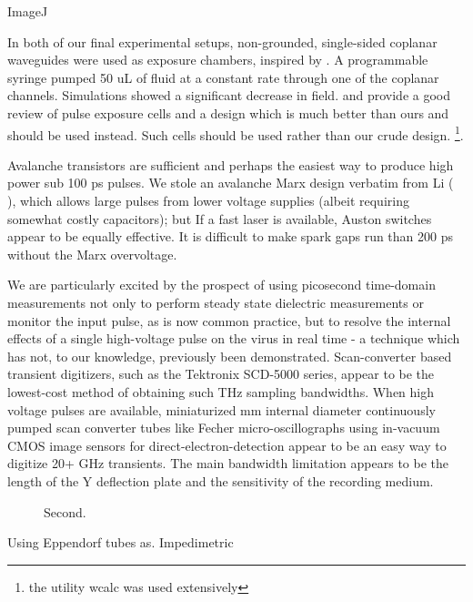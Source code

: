 \documentclass[paper.tex]{subfiles}
\begin{document}
ImageJ

In both of our final experimental setups, non-grounded, single-sided coplanar waveguides were used as exposure chambers, inspired by \cite{Microwave2007}. A programmable syringe pumped 50 uL of fluid at a constant rate through one of the coplanar channels. Simulations showed a significant decrease in field. \cite{Microchamber2011} and \cite{Characterization2012} provide a good review of pulse exposure cells and a design which is much better than ours and should be used instead. Such cells should be used rather than our crude design. \footnote{the utility wcalc was used extensively}.


Avalanche transistors are sufficient and perhaps the easiest way to produce high power sub 100 ps pulses. We stole an avalanche Marx design verbatim from Li (\cite{Development2016b} \cite{Design2018c}), which allows large pulses from lower voltage supplies (albeit requiring somewhat costly capacitors); but  If a fast laser is available, Auston switches appear to be equally effective. It is difficult to make spark gaps run than 200 ps without the Marx overvoltage.

We are particularly excited by the prospect of using picosecond time-domain measurements not only to perform steady state dielectric measurements or monitor the input pulse, as is now common practice, but to resolve the internal effects of a single high-voltage pulse on the virus in real time - a technique which has not, to our knowledge, previously been demonstrated. Scan-converter based transient digitizers, such as the Tektronix SCD-5000 series, appear to be the lowest-cost method of obtaining such THz sampling bandwidths. When high voltage pulses are available, miniaturized  mm internal diameter continuously pumped scan converter tubes like Fecher micro-oscillographs using in-vacuum CMOS image sensors for direct-electron-detection appear to be an easy way to digitize 20+ GHz transients. The main bandwidth limitation appears to be the length of the Y deflection plate and the sensitivity of the recording medium.

\begin{figure}[H]
	\centering

	\caption{Second.}
	\hfill
	
\end{figure}


Using Eppendorf tubes as. Impedimetric 
\end{document}
